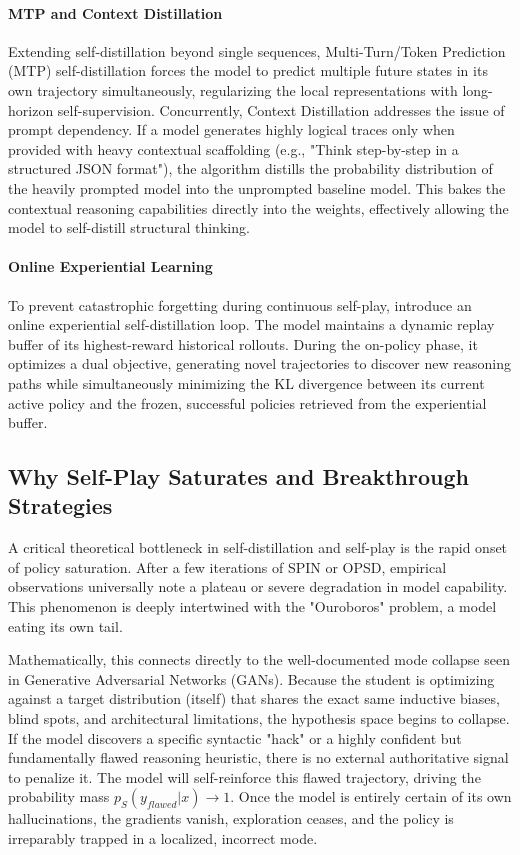 \documentclass{article} %
\begin{document}
\paragraph{MTP and Context Distillation}
Extending self-distillation beyond single sequences, Multi-Turn/Token Prediction (MTP) self-distillation \citep{2602.06019} forces the model to predict multiple future states in its own trajectory simultaneously, regularizing the local representations with long-horizon self-supervision. Concurrently, Context Distillation \citep{2602.12275} addresses the issue of prompt dependency. If a model generates highly logical traces only when provided with heavy contextual scaffolding (e.g., "Think step-by-step in a structured JSON format"), the algorithm distills the probability distribution of the heavily prompted model into the unprompted baseline model. This bakes the contextual reasoning capabilities directly into the weights, effectively allowing the model to self-distill structural thinking.

\paragraph{Online Experiential Learning}
To prevent catastrophic forgetting during continuous self-play, \citet{2603.16856} introduce an online experiential self-distillation loop. The model maintains a dynamic replay buffer of its highest-reward historical rollouts. During the on-policy phase, it optimizes a dual objective, generating novel trajectories to discover new reasoning paths while simultaneously minimizing the KL divergence between its current active policy and the frozen, successful policies retrieved from the experiential buffer.

\subsection{Why Self-Play Saturates and Breakthrough Strategies}
\label{subsec:saturation_analysis}

A critical theoretical bottleneck in self-distillation and self-play is the rapid onset of policy saturation. After a few iterations of SPIN or OPSD, empirical observations universally note a plateau or severe degradation in model capability. This phenomenon is deeply intertwined with the "Ouroboros" problem, a model eating its own tail.

Mathematically, this connects directly to the well-documented mode collapse seen in Generative Adversarial Networks (GANs). Because the student is optimizing against a target distribution (itself) that shares the exact same inductive biases, blind spots, and architectural limitations, the hypothesis space begins to collapse. If the model discovers a specific syntactic "hack" or a highly confident but fundamentally flawed reasoning heuristic, there is no external authoritative signal to penalize it. The model will self-reinforce this flawed trajectory, driving the probability mass $p_S(y_{flawed}|x) \to 1$. Once the model is entirely certain of its own hallucinations, the gradients vanish, exploration ceases, and the policy is irreparably trapped in a localized, incorrect mode.
\end{document}
